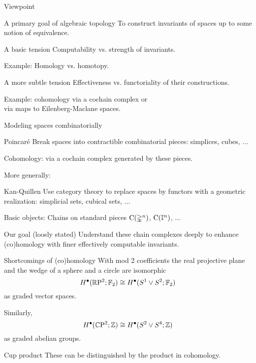 
\begin{frame}{Viewpoint}
	\vskip -10pt
	\begin{block}{A primary goal of algebraic topology}
		To construct invariants of spaces up to some notion of equivalence.
	\end{block}

	\medskip\pause
	\begin{block}{A basic tension}
		Computability vs. strength of invariants.
	\end{block}

	\medskip \textcolor{pblue}{Example:}
	Homology vs. homotopy.

	\medskip\pause
	\begin{block}{A more subtle tension}
		Effectiveness vs. functoriality of their constructions.
	\end{block}

	\medskip \textcolor{pblue}{Example:}
	cohomology via a cochain complex or \\
	\hspace*{40pt} via maps to Eilenberg-Maclane spaces.
\end{frame}

\begin{frame}{Modeling spaces combinatorially}
	\pause
	\begin{block}{Poincar\'{e}}
		Break spaces into contractible combinatorial pieces: simplices, cubes, ...
	\end{block}

	\pause \textcolor{pblue}{Cohomology:}
	via a cochain complex generated by these pieces.

	\medskip\pause	More generally:
	\begin{block}{Kan-Quillen}
		Use category theory to replace spaces by functors with a geometric realization: simplicial sets, cubical sets, ...
	\end{block}

	\pause \textcolor{pblue}{Basic objects:}
	Chains on standard pieces $\operatorname{C}(\mathbb{\Delta}^n)$, $\operatorname{C}(\mathbb{I}^n)$, ...

	\smallskip\pause
	\begin{block}{Our goal (loosly stated)}
		Understand these chain complexes deeply to enhance (co)homology with finer effectively computable invariants.
	\end{block}
\end{frame}

\begin{frame}{Shortcomings of (co)homology}
	\pause With mod 2 coefficients the real projective plane and the wedge of a sphere and a circle are isomorphic
	\[
	H^\bullet(\mathbb{R} \mathrm{P}^2; {\mathbb{F}_2}) \cong H^\bullet(S^1 \vee S^2; {\mathbb{F}_2})
	\]
	as graded vector spaces.

	\bigskip\pause
	Similarly,
	\[
	H^\bullet(\mathbb{C} \mathrm{P}^2; \mathbb{Z}) \cong H^\bullet(S^2 \vee S^4; \mathbb{Z})
	\]
	as graded abelian groups.

	\bigskip\pause
	\begin{block}{Cup product}
		These can be distinguished by the product in cohomology.
	\end{block}
\end{frame}